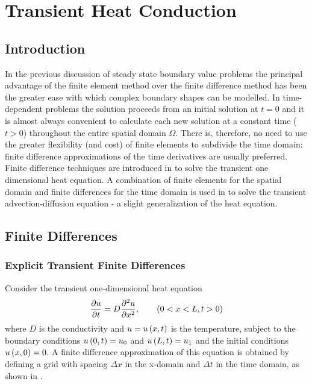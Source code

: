 \chapter{Transient Heat Conduction}

\section{Introduction}

In the previous discussion of steady state boundary value problems the
principal advantage of the finite element method over the finite difference
method has been the greater ease with which complex boundary shapes can be
modelled. In time-dependent problems the solution proceeds from an initial
solution at $t = 0$ and it is almost always convenient to calculate each new
solution at a constant time ($t>0$) throughout the entire spatial domain
$\Omega$.  There is, therefore, no need to use the greater flexibility (and
cost) of finite elements to subdivide the time domain: finite difference
approximations of the time derivatives are usually preferred.  Finite
difference techniques are introduced in  to solve the
transient one dimensional heat equation. A combination of finite elements for
the spatial domain and finite differences for the time domain is used in
 to solve the transient advection-diffusion
equation - a slight generalization of the heat equation.

\section{Finite Differences}
\label{sec:finite} 

\subsection{Explicit Transient Finite Differences}

Consider the transient one-dimensional heat equation 
\begin{equation}
   \dfrac{\partial u}{\partial t}  = D \dfrac{\partial^{2} u}{\partial {x}^{2}} , \qquad \left( 0<x<L, t>0 \right)
  \label{eqn:1DHT}
\end{equation}
where $D$ is the conductivity and $u= u\left( x,t \right) $ is the temperature,
subject to the boundary conditions $ u\left( 0,t \right)  = u_{0}$ and $ u\left( L,t \right) 
= u_{1}$ and the initial conditions $ u\left( x,0 \right)  = 0$. A finite difference
approximation of this equation is obtained by defining a grid with spacing
$\Delta x$ in the x-domain and $\Delta t$ in the time domain, as shown in
.

